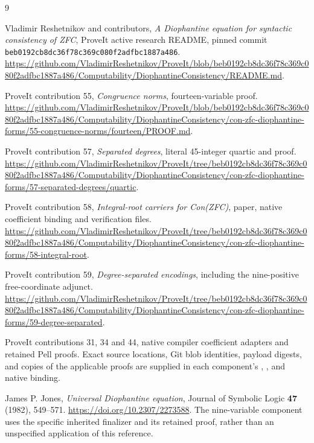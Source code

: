 \documentclass[11pt,a4paper]{article}
\theoremstyle{definition}
\theoremstyle{remark}
\begin{document}
\begin{thebibliography}{9}
\raggedright
{}
Vladimir Reshetnikov and contributors,
\emph{A Diophantine equation for syntactic consistency of ZFC},
ProveIt active research README, pinned commit
\texttt{beb0192cb8dc36f78c369c080f2adfbc1887a486}.
\url{https://github.com/VladimirReshetnikov/ProveIt/blob/beb0192cb8dc36f78c369c080f2adfbc1887a486/Computability/DiophantineConsistency/README.md}.

ProveIt contribution 55, \emph{Congruence norms}, fourteen-variable proof.
\url{https://github.com/VladimirReshetnikov/ProveIt/blob/beb0192cb8dc36f78c369c080f2adfbc1887a486/Computability/DiophantineConsistency/con-zfc-diophantine-forms/55-congruence-norms/fourteen/PROOF.md}.

ProveIt contribution 57, \emph{Separated degrees}, literal 45-integer quartic
and proof.
\url{https://github.com/VladimirReshetnikov/ProveIt/tree/beb0192cb8dc36f78c369c080f2adfbc1887a486/Computability/DiophantineConsistency/con-zfc-diophantine-forms/57-separated-degrees/quartic}.

ProveIt contribution 58, \emph{Integral-root carriers for Con(ZFC)},
paper, native coefficient binding and verification files.
\url{https://github.com/VladimirReshetnikov/ProveIt/tree/beb0192cb8dc36f78c369c080f2adfbc1887a486/Computability/DiophantineConsistency/con-zfc-diophantine-forms/58-integral-root}.

ProveIt contribution 59, \emph{Degree-separated encodings}, including the
nine-positive free-coordinate adjunct.
\url{https://github.com/VladimirReshetnikov/ProveIt/tree/beb0192cb8dc36f78c369c080f2adfbc1887a486/Computability/DiophantineConsistency/con-zfc-diophantine-forms/59-degree-separated}.

ProveIt contributions 31, 34 and 44, native compiler coefficient adapters
and retained Pell proofs.  Exact source locations, Git blob identities,
payload digests, and copies of the applicable proofs are supplied in each
component's , , and native binding.

James P. Jones, \emph{Universal Diophantine equation},
Journal of Symbolic Logic \textbf{47} (1982), 549--571.
\url{https://doi.org/10.2307/2273588}.
The nine-variable component uses the specific inherited finalizer and its
retained proof, rather than an unspecified application of this reference.
\end{thebibliography}
\end{document}
